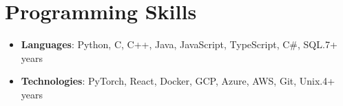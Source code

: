 \documentclass[letterpaper,11pt]{article}
\newcommand{\resumeLineItem}[3]{
    \item[]{
        \textbf{#1}{: #2}\hfill{#3}\vspace{-4pt} %
    }
}
\newcommand{\resumeSubHeadingListStart}{\begin{itemize}[leftmargin=*]}
\newcommand{\resumeSubHeadingListEnd}{\end{itemize}}
\begin{document}
\section{Programming Skills}
\resumeSubHeadingListStart
\resumeLineItem{Languages}{Python, C, C++, Java, JavaScript, TypeScript, C\#, SQL.}{7+ years}
\resumeLineItem{Technologies}{PyTorch, React, Docker, GCP, Azure, AWS, Git, Unix.}{4+ years}
\resumeSubHeadingListEnd

\end{document}
